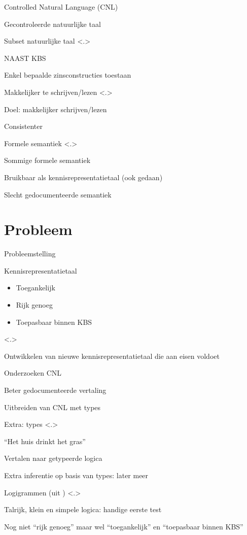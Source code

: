 \documentclass[notes, dvipsnames]{beamer}
\newcommand{\seperation}{
	\vspace{1em}
	\ppause
}
\newcommand{\hitem}{
	\ppause
	\item
}
\newcommand{\ppause}{\onslide<+>}
\newcommand{\nnote}[1]{\note<.>{#1}}
\begin{document}
	\begin{frame}{Controlled Natural Language (CNL)}
		\begin{itemize}
      \hitem Gecontroleerde natuurlijke taal
      \item Subset natuurlijke taal
      \nnote{
        NAAST KBS
        \item Enkel bepaalde zinsconstructies toestaan
      }

      \seperation
      \item Makkelijker te schrijven/lezen
      \nnote{
        \item Doel: makkelijker schrijven/lezen
        \item Consistenter
      }
      \hitem Formele semantiek
      \nnote{
        \item Sommige formele semantiek
        \item Bruikbaar als kennisrepresentatietaal (ook gedaan)
        \item Slecht gedocumenteerde semantiek
      }
		\end{itemize}
	\end{frame}

	\section{Probleem}
	\begin{frame}{Probleemstelling}
		\begin{itemize}
      \hitem Kennisrepresentatietaal
        \begin{itemize}
          \item Toegankelijk
          \item Rijk genoeg
          \item Toepasbaar binnen KBS
        \end{itemize}
        \nnote{
          \item Ontwikkelen van nieuwe kennisrepresentatietaal die aan eisen voldoet
          \item Onderzoeken CNL
          \item Beter gedocumenteerde vertaling
          \item Uitbreiden van CNL met types
        }

      \seperation
      \item Extra: types
      \nnote{
        ``Het huis drinkt het gras''
        \item Vertalen naar getypeerde logica
        \item Extra inferentie op basis van types: later meer
      }

      \seperation
      \item Logigrammen (uit \cite{logigrammen})
        \nnote{
          \item Talrijk, klein en simpele logica: handige eerste test
          \item Nog niet ``rijk genoeg'' maar wel ``toegankelijk'' en ``toepasbaar binnen KBS''
        }
		\end{itemize}
	\end{frame}
\end{document}
